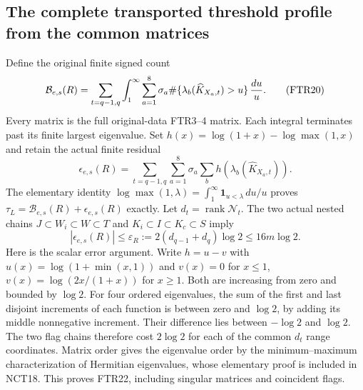 \subsection{The complete transported threshold profile from the common matrices}
Define the original finite signed count
\[
 \mathcal B_{e,s}(R)=\sum_{t=q-1,q}\int_1^\infty
       \sum_{a=1}^8\sigma_a
       \#\{\lambda_b(\widehat K_{X_a,t})>u\}\,{du\over u}.
                                                               \tag{FTR20}
\]
Every matrix is the full original-data FTR3--4 matrix. Each integral
terminates past its finite largest eigenvalue. Set $h(x)=
\log(1+x)-\log\max(1,x)$ and retain the actual finite residual
\[
 \epsilon_{e,s}(R)=\sum_{t=q-1,q}\sum_{a=1}^8\sigma_a
                 \sum_b h(\lambda_b(\widehat K_{X_a,t})).
                                                               \tag{FTR21}
\]
The elementary identity
$\log\max(1,\lambda)=\int_1^\infty\mathbf1_{u<\lambda}\,du/u$
proves $\tau_L=\mathcal B_{e,s}(R)+\epsilon_{e,s}(R)$ exactly.
Let $d_t=\operatorname{rank}\mathscr N_t$. The two actual nested
chains $J\subset W_i\subset W\subset T$ and
$K_i\subset I\subset K_c\subset S$ imply
\[
 |\epsilon_{e,s}(R)|\le
       \varepsilon_R:=2(d_{q-1}+d_q)\log2\le16m\log2.    \tag{FTR22}
\]
Here is the scalar error argument. Write $h=u-v$ with
$u(x)=\log(1+\min(x,1))$ and $v(x)=0$ for $x\le1$,
$v(x)=\log(2x/(1+x))$ for $x\ge1$. Both are increasing
from zero and bounded by $\log2$. For four ordered eigenvalues,
the sum of the first and last disjoint increments of each function
is between zero and $\log2$, by adding its middle nonnegative
increment. Their difference lies between $-\log2$ and $\log2$.
The two flag chains therefore cost $2\log2$ for each of the common
$d_t$ range coordinates. Matrix order gives the eigenvalue order
by the minimum--maximum characterization of Hermitian eigenvalues,
whose elementary proof is included in NCT18. This proves FTR22,
including singular matrices and coincident flags.


